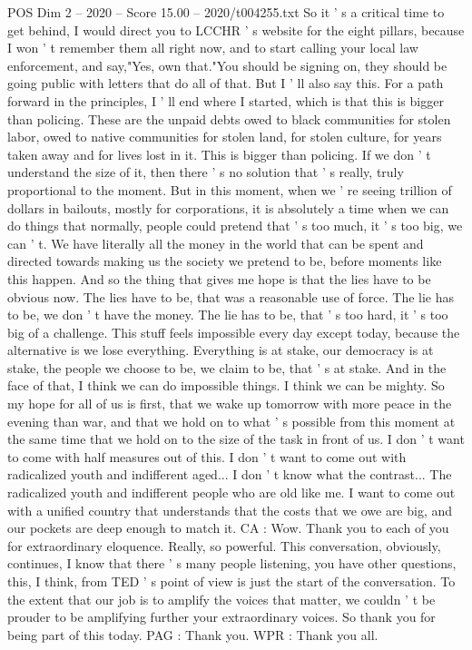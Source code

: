 \begin{textsample}{POS Dim 2 – 2020 – Score 15.00 – 2020/t004255.txt}
So it ' s a critical time to get behind, I would direct you to LCCHR ' s website for the eight pillars, because I won ' t remember them all right now, and to start calling your local law enforcement, and say,"Yes, own that."You should be signing on, they should be going public with letters that do all of that.
But I ' ll also say this.
For a path forward in the principles, I ' ll end where I started, which is that this is bigger than policing.
These are the unpaid debts owed to black communities for stolen labor, owed to native communities for stolen land, for stolen culture, for years taken away and for lives lost in it.
This is bigger than policing.
If we don ' t understand the size of it, then there ' s no solution that ' s really, truly proportional to the moment.
But in this moment, when we ' re seeing trillion of dollars in bailouts, mostly for corporations, it is absolutely a time when we can do things that normally, people could pretend that ' s too much, it ' s too big, we can ' t.
We have literally all the money in the world that can be spent and directed towards making us the society we pretend to be, before moments like this happen.
And so the thing that gives me hope is that the lies have to be obvious now.
The lies have to be, that was a reasonable use of force.
The lie has to be, we don ' t have the money.
The lie has to be, that ' s too hard, it ' s too big of a challenge.
This stuff feels impossible every day except today, because the alternative is we lose everything.
Everything is at stake, our democracy is at stake, the people we choose to be, we claim to be, that ' s at stake.
And in the face of that, I think we can do impossible things.
I think we can be mighty.
So my hope for all of us is first, that we wake up tomorrow with more peace in the evening than war, and that we hold on to what ' s possible from this moment at the same time that we hold on to the size of the task in front of us.
I don ' t want to come with half measures out of this.
I don ' t want to come out with radicalized youth and indifferent aged...
I don ' t know what the contrast...
The radicalized youth and indifferent people who are old like me.
I want to come out with a unified country that understands that the costs that we owe are big, and our pockets are deep enough to match it.
CA : Wow.
Thank you to each of you for extraordinary eloquence.
Really, so powerful.
This conversation, obviously, continues, I know that there ' s many people listening, you have other questions, this, I think, from TED ' s point of view is just the start of the conversation.
To the extent that our job is to amplify the voices that matter, we couldn ' t be prouder to be amplifying further your extraordinary voices.
So thank you for being part of this today.
PAG : Thank you.
WPR : Thank you all.

\end{textsample}
